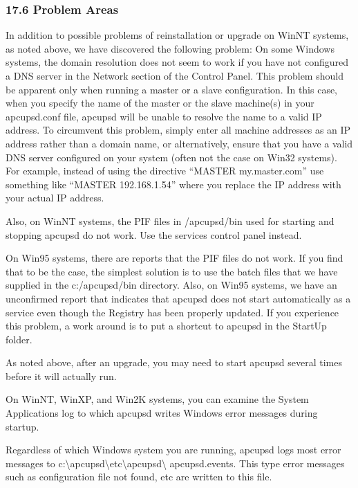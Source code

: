 {{{{{{{{{{\label{Problem-Areas}

\subsubsection*{17.6 Problem Areas}

\label{index-Problems_002c-Windows-178}
\label{index-Windows_002c-Problems-179}
In addition to possible problems of reinstallation or upgrade on WinNT
systems, as noted above, we have discovered the following problem: On some
Windows systems, the domain resolution does not seem to work if you have not
configured a DNS server in the Network section of the Control Panel. This
problem should be apparent only when running a master or a slave
configuration. In this case, when you specify the name of the master or the
slave machine(s) in your apcupsd.conf file, apcupsd will be unable to resolve
the name to a valid IP address. To circumvent this problem, simply enter all
machine addresses as an IP address rather than a domain name, or
alternatively, ensure that you have a valid DNS server configured on your
system (often not the case on Win32 systems).  For example, instead of using
the directive ``MASTER my.master.com'' use something like ``MASTER
192.168.1.54'' where you replace the IP address with your actual IP address.  

Also, on WinNT systems, the PIF files in /apcupsd/bin used for starting and
stopping apcupsd do not work. Use the services control panel instead.  

On Win95 systems, there are reports that the PIF files do not work. If you
find that to be the case, the simplest solution is to use the batch files that
we have supplied in the c:/apcupsd/bin directory. Also, on Win95 systems, we
have an unconfirmed report that indicates that apcupsd does not start
automatically as a service even though the Registry has been properly updated.
If you experience this problem, a work around is to put a shortcut to apcupsd
in the StartUp folder.  

As noted above, after an upgrade, you may need to start apcupsd several times
before it will actually run.  

On WinNT, WinXP, and Win2K systems, you can examine the System Applications
log to which apcupsd writes Windows error messages during startup.  

Regardless of which Windows system you are running, apcupsd logs most error
messages to
c:\textbackslash{}apcupsd\textbackslash{}etc\textbackslash{}apcupsd\textbackslash
{}apcupsd.events. This type error messages such as configuration file not
found, etc are written to this file. 

}}}}}}}}}}
